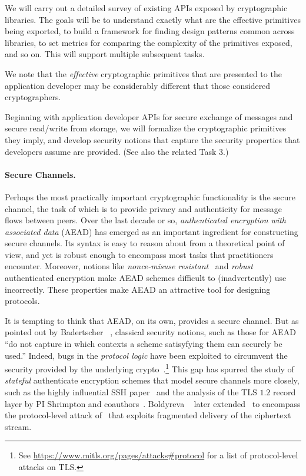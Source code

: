 \begin{task}
  We will carry out a detailed survey of existing APIs exposed by
  cryptographic libraries. The goals will be to understand exactly
  what are the effective primitives being exported, to build a
  framework for finding design patterns common across libraries,
  to set metrics for comparing the complexity of the primitives
  exposed, and so on. This will support multiple subsequent
  tasks.
\end{task}

We note that the \emph{effective} cryptographic primitives that are presented to the
application developer may be considerably different that those
considered cryptographers.  

\begin{task}
Beginning with application developer APIs for secure exchange of messages
and secure read/write from storage, we will formalize the
cryptographic primitives they imply, and develop security notions that
capture the security properties that developers assume are provided.
(See also the related Task 3.)
\end{task}



\paragraph{Secure Channels. }
Perhaps the most practically important cryptographic functionality is the
secure channel, the task of which is to provide privacy and authenticity for
message flows between peers.
%
Over the last decade or so, \emph{authenticated encryption with associated data}
(AEAD) has emerged as an important ingredient for constructing secure channels.
%
Its syntax is easy to reason about from a theoretical point of view, and yet is
robust enough to encompass most tasks that practitioners encounter. Moreover,
notions like \emph{nonce-misuse resistant}~\cite{RS06} and
\emph{robust}~\cite{HKR15} authenticated encryption make AEAD schemes difficult
to (inadvertently) use incorrectly. These properties make AEAD an attractive
tool for designing protocols.

It is tempting to think that AEAD, on its own, provides a secure channel.  But
as pointed out by Badertscher \etal~\cite{BMM+15}, classical security
notions, such as those for AEAD ``do not capture in which contexts a scheme
satisyfying them can securely be used.''  Indeed, bugs in the
\emph{protocol logic} have been exploited to circumvent the
security provided by the underlying
crypto~\cite{Vau02,BKN02,APW09}.\footnote{See
\url{https://www.mitls.org/pages/attacks\#protocol} for a list of
protocol-level attacks on TLS.}  This gap has spurred the study of
\emph{stateful} authenticate encryption schemes that model secure channels more
closely, such as the highly influential SSH paper~\cite{BKN02} and the analysis
of the TLS $1.2$ record layer by PI Shrimpton and coauthors~\cite{PRS11}. Boldyreva
\etal~\cite{BDPS12} later extended~\cite{BKN02} to encompass the protocol-level
attack of~\cite{APW09} that exploits fragmented delivery of the
ciphertext stream. 

